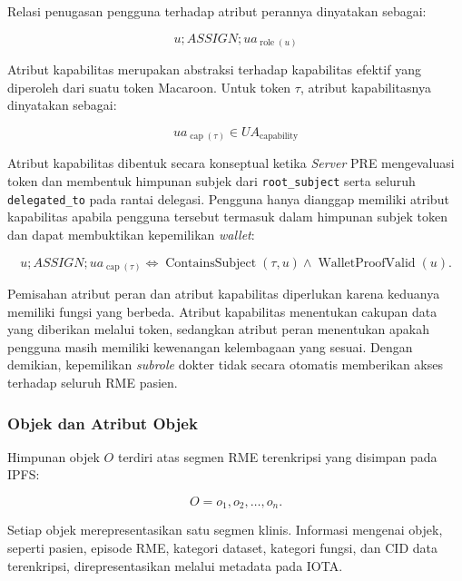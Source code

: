 \documentclass[bahasa, 12pt, a4paper, onecolumn, oneside, final]{report}
\begin{document}
Relasi penugasan pengguna terhadap atribut perannya dinyatakan sebagai:

\begin{equation}
	u ; ASSIGN ; ua_{\operatorname{role}(u)}
\end{equation}

Atribut kapabilitas merupakan abstraksi terhadap kapabilitas efektif yang diperoleh dari suatu token Macaroon. Untuk token $\tau$, atribut kapabilitasnya dinyatakan sebagai:

\begin{equation}
	ua_{\operatorname{cap}(\tau)}
	\in UA_{\text{capability}}
\end{equation}

Atribut kapabilitas dibentuk secara konseptual ketika \textit{Server} PRE mengevaluasi token dan membentuk himpunan subjek dari \texttt{root\_subject} serta seluruh \texttt{delegated\_to} pada rantai delegasi. Pengguna hanya dianggap memiliki atribut kapabilitas apabila pengguna tersebut termasuk dalam himpunan subjek token dan dapat membuktikan kepemilikan \textit{wallet}:

\begin{equation}
	u ; ASSIGN ; ua_{\operatorname{cap}(\tau)}
	\iff
	\operatorname{ContainsSubject}(\tau,u)
	\land
	\operatorname{WalletProofValid}(u).
\end{equation}

Pemisahan atribut peran dan atribut kapabilitas diperlukan karena keduanya memiliki fungsi yang berbeda. Atribut kapabilitas menentukan cakupan data yang diberikan melalui token, sedangkan atribut peran menentukan apakah pengguna masih memiliki kewenangan kelembagaan yang sesuai. Dengan demikian, kepemilikan \textit{subrole} dokter tidak secara otomatis memberikan akses terhadap seluruh RME pasien.

\subsubsection{Objek dan Atribut Objek}

Himpunan objek $O$ terdiri atas segmen RME terenkripsi yang disimpan pada IPFS:

\begin{equation}
	O = {o_1,o_2,\ldots,o_n}.
\end{equation}

Setiap objek merepresentasikan satu segmen klinis. Informasi mengenai objek, seperti pasien, episode RME, kategori dataset, kategori fungsi, dan CID data terenkripsi, direpresentasikan melalui metadata pada IOTA.
\end{document}
